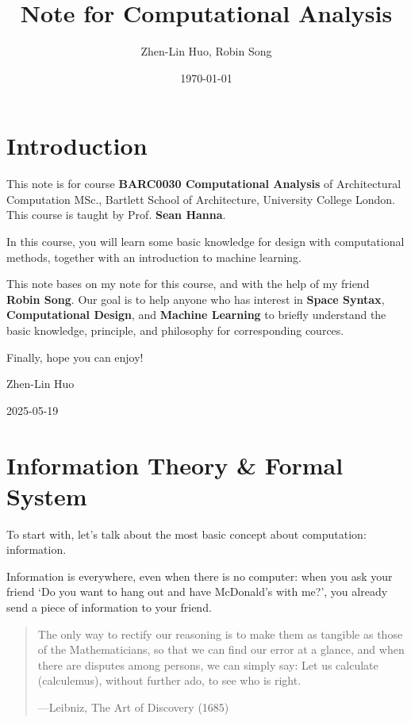 \documentclass[a4paper, openany]{book}
\title{Note for Computational Analysis}
\author{Zhen-Lin Huo, Robin Song}
\date{\today}
\begin{document}
\maketitle
\frontmatter
\tableofcontents

\mainmatter

\chapter{Introduction}

This note is for course \textbf{BARC0030 Computational Analysis} of Architectural Computation MSc., Bartlett School of Architecture, University College London. This course is taught by Prof. \textbf{Sean Hanna}.

In this course, you will learn some basic knowledge for design with computational methods, together with an introduction to machine learning.

This note bases on my note for this course, and with the help of my friend \textbf{Robin Song}. Our goal is to help anyone who has interest in \textbf{Space Syntax}, \textbf{Computational Design}, and \textbf{Machine Learning} to briefly understand the basic knowledge, principle, and philosophy for corresponding cources.

Finally, hope you can enjoy!

Zhen-Lin Huo

2025-05-19

\chapter{Information Theory \& Formal System}

To start with, let's talk about the most basic concept about computation: information.

Information is everywhere, even when there is no computer: when you ask your friend `Do you want to hang out and have McDonald's with me?', you already send a piece of information to your friend.

\begin{quotation}
The only way to rectify our reasoning is to make them as tangible as those of the Mathematicians, so that we can find our error at a glance, and when there are disputes among persons, we can simply say: Let us calculate (calculemus), without further ado, to see who is right.

\hfill ---Leibniz, The Art of Discovery (1685)
\end{quotation}
\end{document}
